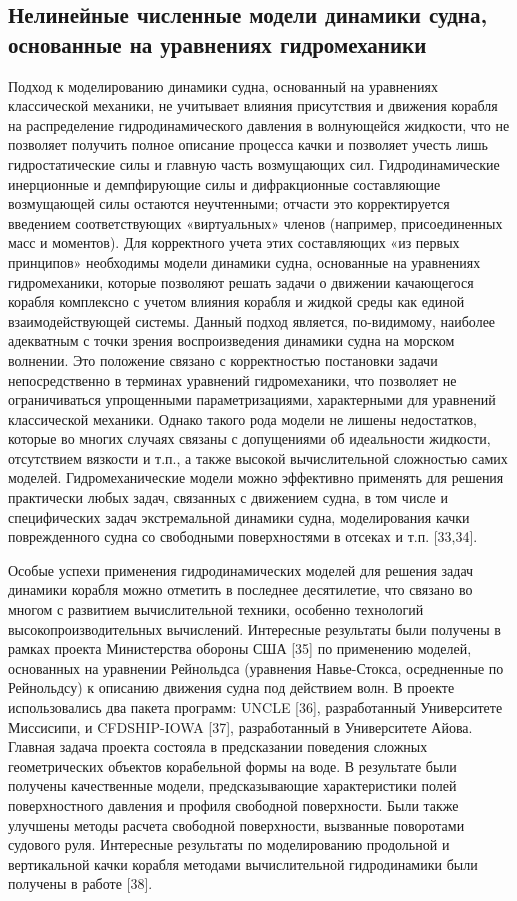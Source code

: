 \subsection{Нелинейные численные модели динамики судна, основанные на уравнениях гидромеханики}
Подход к моделированию динамики судна, основанный на уравнениях классической механики, не учитывает влияния присутствия и движения корабля на распределение гидродинамического давления в волнующейся жидкости, что не позволяет получить полное описание процесса качки и позволяет учесть лишь гидростатические силы и главную часть возмущающих сил. Гидродинамические инерционные и демпфирующие силы и дифракционные составляющие возмущающей силы остаются неучтенными; отчасти это корректируется введением соответствующих «виртуальных» членов (например, присоединенных масс и моментов). Для корректного учета этих составляющих «из первых принципов» необходимы модели динамики судна, основанные на уравнениях гидромеханики, которые позволяют решать задачи о движении качающегося корабля комплексно с учетом влияния корабля и жидкой среды как единой взаимодействующей системы. Данный подход является, по-видимому, наиболее адекватным с точки зрения воспроизведения динамики судна на морском волнении. Это положение связано с корректностью постановки задачи непосредственно в терминах уравнений гидромеханики, что позволяет не ограничиваться упрощенными параметризациями, характерными для уравнений классической механики. Однако такого рода модели не лишены недостатков, которые во многих случаях связаны с допущениями об идеальности жидкости, отсутствием вязкости и т.п., а также высокой вычислительной сложностью самих моделей. Гидромеханические модели можно эффективно применять для решения практически любых задач, связанных с движением судна, в том числе и специфических задач экстремальной динамики судна, моделирования качки поврежденного судна со свободными поверхностями в отсеках и т.п. [33,34].

Особые успехи применения гидродинамических моделей для решения задач динамики корабля можно отметить в последнее десятилетие, что связано во многом с развитием вычислительной техники, особенно технологий высокопроизводительных вычислений. Интересные результаты были получены в рамках проекта Министерства обороны США [35] по применению моделей, основанных на уравнении Рейнольдса (уравнения Навье-Стокса, осредненные по Рейнольдсу) к описанию движения судна под действием волн. В проекте использовались два пакета программ: UNCLE [36], разработанный Университете Миссисипи, и CFDSHIP-IOWA [37], разработанный в Университете Айова. Главная задача проекта состояла в предсказании поведения сложных геометрических объектов корабельной формы на воде. В результате были получены качественные модели, предсказывающие характеристики полей поверхностного давления и профиля свободной поверхности. Были также улучшены методы расчета свободной поверхности, вызванные поворотами судового руля. Интересные результаты по моделированию продольной и вертикальной качки корабля методами вычислительной гидродинамики были получены в работе [38].

